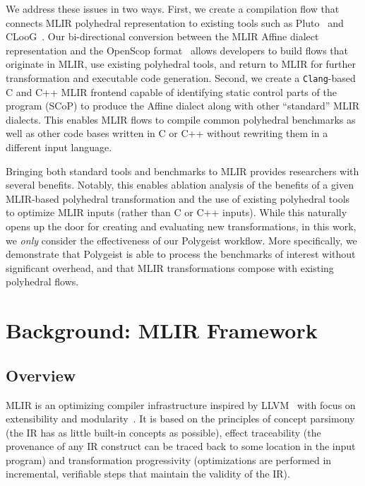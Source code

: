 \documentclass[sigplan]{acmart}
\newcommand{\icode}[1]{{\texttt {#1}}}
\newcommand{\tool}{Polygeist\xspace}
\newcommand{\scop}{SCoP\xspace}
\begin{document}
We address these issues in two ways. First, we create a compilation flow that connects MLIR polyhedral representation to existing tools such as Pluto~\cite{Bondhugula2008Pluto} and CLooG~\cite{cloog}. Our bi-directional conversion between the MLIR Affine dialect~\cite{mlir_affine} representation and the OpenScop format~\cite{openscop} allows developers to build flows that originate in MLIR, use existing polyhedral tools, and return to MLIR for further transformation and executable code generation. Second, we create a \icode{Clang}-based C and C++ MLIR frontend capable of identifying static control parts of the program (\scop) to produce the Affine dialect along with other ``standard'' MLIR dialects. This enables MLIR flows to compile common polyhedral benchmarks as well as other code bases written in C or C++ without rewriting them in a different input language.

Bringing both standard tools and benchmarks to MLIR provides researchers with several benefits. Notably, this enables ablation analysis of the benefits of a given MLIR-based polyhedral transformation and the use of existing polyhedral tools to optimize MLIR inputs (rather than C or C++ inputs). While this naturally opens up the door for creating and evaluating new transformations, in this work, we \emph{only} consider the effectiveness of our \tool workflow. More specifically, we demonstrate that \tool is able to process the benchmarks of interest without significant overhead, and that MLIR transformations compose with existing polyhedral flows.

\section{Background: MLIR Framework}
\subsection{Overview}
MLIR is an optimizing compiler infrastructure inspired by LLVM~\cite{llvm} with focus on extensibility and modularity~\cite{mlir}.
It is based on the principles of concept parsimony (the IR has as little built-in concepts as possible), effect traceability (the provenance of any IR construct can be traced back to some location in the input program) and transformation progressivity (optimizations are performed in incremental, verifiable steps that maintain the validity of the IR).
\end{document}
